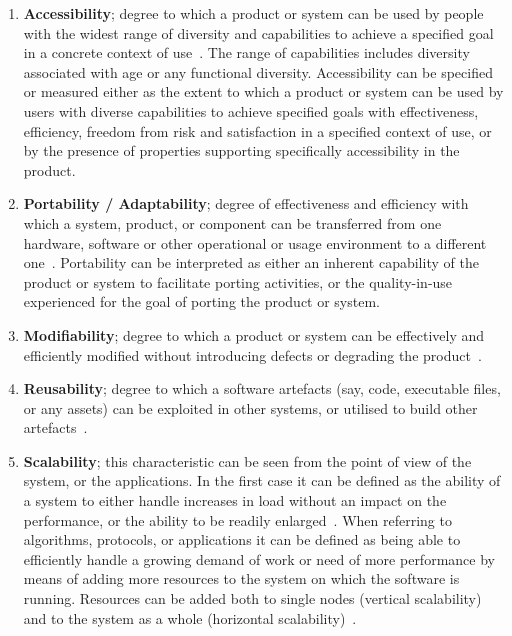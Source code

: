 \begin{enumerate}
    \item \textbf{Accessibility}; degree to which a product or system can be used by people with the widest range of diversity and capabilities to achieve a specified goal in a concrete context of use~\cite{iso_25010_2011_2017}. The range of capabilities includes diversity associated with age or any functional diversity. Accessibility can be specified or measured either as the extent to which a product or system can be used by users with diverse capabilities to achieve specified goals with effectiveness, efficiency, freedom from risk and satisfaction in a specified context of use, or by the presence of properties supporting specifically accessibility in the product.

    \item \textbf{Portability / Adaptability}; degree of effectiveness and efficiency with which a system, product, or component can be transferred from one hardware, software or other operational or usage environment to a different one~\cite{iso_25010_2011_2017}. Portability can be interpreted as either an inherent capability of the product or system to facilitate porting activities, or the quality-in-use experienced for the goal of porting the product or system.

    \item \textbf{Modifiability}; degree to which a product or system can be effectively and efficiently modified without introducing defects or degrading the product~\cite{iso_25010_2011_2017}.

    \item \textbf{Reusability}; degree to which a software artefacts (say, code, executable files, or any assets) can be exploited in other systems, or utilised to build other artefacts~\cite{iso_25010_2011_2017}.

    \item \textbf{Scalability}; this characteristic can be seen from the point of view of the system, or the applications. In the first case it can be defined as the ability of a system to either handle increases in load without an impact on the performance, or the ability to be readily enlarged~\cite{microsoft_2010}. When referring to algorithms, protocols, or applications it can be defined as being able to efficiently handle a growing demand of work or need of more performance by means of adding more resources to the system on which the software is running. Resources can be added both to single nodes (vertical scalability) and to the system as a whole (horizontal scalability)~\cite{bondi_2000}.


\end{enumerate}
